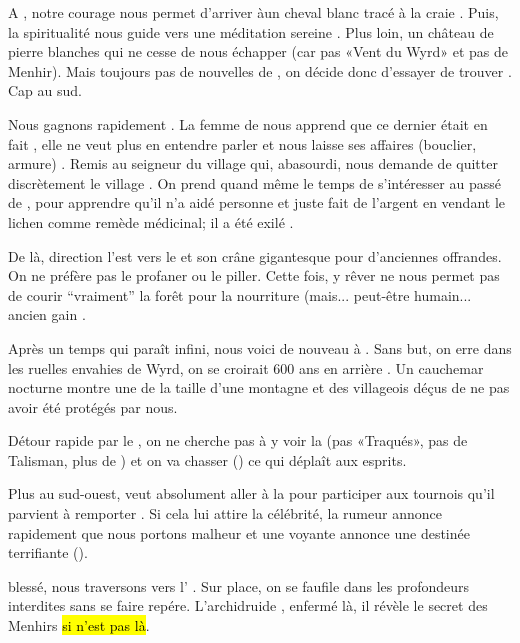 \documentclass[11pt]{article}
\begin{document}
A \murmures{}, notre courage nous permet d'arriver àun cheval blanc tracé à la craie . Puis, la spiritualité nous guide vers une méditation sereine . Plus loin, un château de pierre blanches qui ne cesse de nous échapper (car pas «Vent du Wyrd» et pas de Menhir). Mais toujours pas de nouvelles de \neante{}, on décide donc d'essayer de trouver \orrin{}. Cap au sud.

Nous gagnons rapidement \blanc{}. La femme de \fael{} nous apprend que ce dernier était en fait \galaad{}, elle ne veut plus en entendre parler et nous laisse ses affaires (bouclier, armure) . Remis au seigneur du village qui, abasourdi, nous demande de quitter discrètement le village . On prend quand même le temps de s'intéresser au passé de \breagach{}, pour apprendre qu'il n'a aidé personne et juste fait de l'argent en vendant le lichen comme remède médicinal; il a été exilé .

De là, direction l'est vers le \bosquet{}  et son crâne gigantesque pour d'anciennes offrandes. On ne préfère pas le profaner ou le piller. Cette fois, y rêver ne nous permet pas de courir ``vraiment'' la forêt pour la nourriture (mais... peut-être humain... ancien gain .

Après un temps qui paraît infini, nous voici de nouveau à \cuanacht{}. Sans but, on erre dans les ruelles envahies de Wyrd, on se croirait 600 ans en arrière \gain{\terror[3], \magic[1]}. Un cauchemar nocturne montre une \guivre{} de la taille d'une montagne et des villageois déçus de ne pas avoir été protégés par nous.

Détour rapide par le \lacmiroir{}, on ne cherche pas à y voir la \dame{} (pas «Traqués», pas de Talisman, plus de \fauxgraal{}) et on va chasser () ce qui déplaît aux esprits.

Plus au sud-ouest, \beor{} veut absolument aller à la \foire{} pour participer aux tournois qu'il parvient à remporter . Si cela lui attire la célébrité, la rumeur annonce rapidement que nous portons malheur et une voyante annonce une destinée terrifiante  (\beor{}).

\beor{} blessé, nous traversons vers l'\hospice{} . Sur place, on se faufile dans les profondeurs interdites sans se faire repére. L'archidruide \guivrarpion{}, enfermé là, il révèle le secret des Menhirs  \hl{si \larve{} n'est pas l\`a}.
\end{document}
